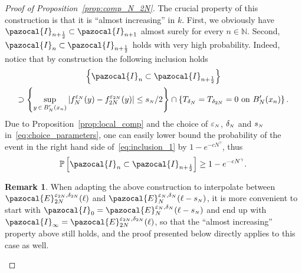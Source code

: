 \documentclass[10pt]{amsart}
\theoremstyle{definition}\newtheorem{defi}[theo]{Definition}\newtheorem{rema}[theo]{Remark}\newtheorem{exam}[theo]{Example}\newtheorem{exem}[theo]{Example}\newtheorem{nota}[theo]{Notation}
\renewcommand{\P}{\mathbb{P}}
\newcommand{\N}{\mathbb{N}}
\newcommand{\si}[1]{{\mathchoice{}{}{\scriptscriptstyle}{}#1}}
\newcommand{\sN}{{\mathchoice{}{}{\scriptscriptstyle}{}N}}
\begin{document}
\begin{proof}[Proof of Proposition~\ref{prop:comp_N_2N}]
The crucial property of this construction is that it is ``almost increasing'' in $k$. First, we obviously have $\pazocal{I}_{n+\frac12}\subset \pazocal{I}_{n+1}$ almost surely for every $n\in\N$. Second, $\pazocal{I}_{n}\subset \pazocal{I}_{n+\frac12}$ holds with very high probability. Indeed, notice that by construction the following inclusion holds
\begin{multline}\label{eq:inclusion_1}
\left\{\pazocal{I}_{n}\subset \pazocal{I}_{n+\frac12}\right\}\\
\supset \left\{\sup_{y\,\in\,B'_N(x_n)} \left|f_N^{\varepsilon_N}(y)-f_{2N}^{\varepsilon_{2N}}(y)\right|\leq s_{\sN}/2\right\} \cap \left\{T_{\delta_{N}} = T_{\delta_{2N}} = 0 \text{ on } B'_N(x_n)\right\}.
\end{multline}
Due to Proposition~\ref{prop:local_comp} and the choice of $\varepsilon_{\sN}$, $\delta_{\sN}$ and $s_{\sN}$ in~\eqref{eq:choice_parameters}, one can easily lower bound the probability of the event in the right hand side of~\eqref{eq:inclusion_1} by $1-e^{-cN^\gamma}$, thus
\begin{equation}\label{eq:n_n+1/2}
\P\left[\pazocal{I}_{n}\subset \pazocal{I}_{n+\frac12}\right]\geq 1-e^{-cN^\gamma}.
\end{equation}

\begin{rema}\label{rmk:interpolation}
When adapting the above construction to interpolate between $\pazocal{E}_{2N}^{\varepsilon_{\si{2N}}, \delta_{\si{2N}}}(\ell)$ and $\pazocal{E}_{N}^{\varepsilon_{\sN},\delta_{\sN}}(\ell-s_{\sN})$, it is more convenient to start with $\pazocal{I}_0=\pazocal{E}_{N}^{\varepsilon_{\sN}, \delta_{\sN}}(\ell-s_{\sN})$ and end up with $\pazocal{I}_{\infty}=\pazocal{E}_{2N}^{\varepsilon_{\si{2N}}, \delta_{\si{2N}}}(\ell)$, so that the ``almost increasing'' property above still holds, and the proof presented below directly applies to this case as well.
\end{rema}



\end{proof}
\end{document}
